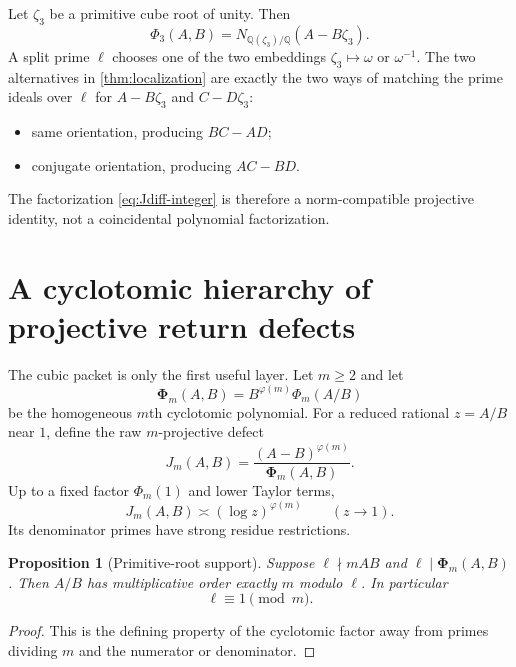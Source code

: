 \documentclass[11pt]{article}
\newtheorem{proposition}[theorem]{Proposition}
\theoremstyle{definition}
\theoremstyle{remark}
\newcommand{\Q}{\mathbb{Q}}
\newcommand{\PhiHom}{\boldsymbol{\Phi}}
\begin{document}
Let $\zeta_3$ be a primitive cube root of unity.  Then
\[
 \Phi_3(A,B)=N_{\Q(\zeta_3)/\Q}(A-B\zeta_3).
\]
A split prime $\ell$ chooses one of the two embeddings $\zeta_3\mapsto\omega$ or $\omega^{-1}$.  The two alternatives in \cref{thm:localization} are exactly the two ways of matching the prime ideals over $\ell$ for $A-B\zeta_3$ and $C-D\zeta_3$:
\begin{itemize}
\item same orientation, producing $BC-AD$;
\item conjugate orientation, producing $AC-BD$.
\end{itemize}
The factorization \eqref{eq:Jdiff-integer} is therefore a norm-compatible projective identity, not a coincidental polynomial factorization.

\section{A cyclotomic hierarchy of projective return defects}
\label{sec:cyclotomic-hierarchy}

The cubic packet is only the first useful layer.  Let $m\ge2$ and let
\begin{equation}\label{eq:homPhi}
 \PhiHom_m(A,B)=B^{\varphi(m)}\Phi_m(A/B)
\end{equation}
be the homogeneous $m$th cyclotomic polynomial.  For a reduced rational $z=A/B$ near $1$, define the raw $m$-projective defect
\begin{equation}\label{eq:Jm}
 J_m(A,B)=\frac{(A-B)^{\varphi(m)}}{\PhiHom_m(A,B)}.
\end{equation}
Up to a fixed factor $\Phi_m(1)$ and lower Taylor terms,
\begin{equation}\label{eq:Jm-asympt}
 J_m(A,B)\asymp (\log z)^{\varphi(m)}
 \qquad (z\to1).
\end{equation}
Its denominator primes have strong residue restrictions.

\begin{proposition}[Primitive-root support]\label{prop:primitive-root-support}
Suppose $\ell\nmid mAB$ and $\ell\mid\PhiHom_m(A,B)$.  Then $A/B$ has multiplicative order exactly $m$ modulo $\ell$.  In particular
\begin{equation}\label{eq:ellmodm}
 \ell\equiv1\pmod m.
\end{equation}
\end{proposition}

\begin{proof}
This is the defining property of the cyclotomic factor away from primes dividing $m$ and the numerator or denominator.
\end{proof}
\end{document}
